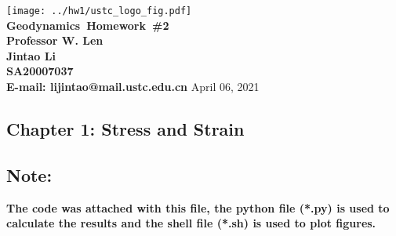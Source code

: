 \documentclass{article}
\makeatletter
\newcommand{\hmwkTitle}{Homework\ \#2}
\newcommand{\hmwkClass}{Geodynamics}
\newcommand{\hmwkClassInstructor}{Professor W. Len}
\newcommand{\hmwkAuthorName}{\textbf{Jintao Li}}
\newcommand{\hmwkAuthorID}{\textbf{SA20007037}}
\newcommand{\hmwkAuthoremail}{\textbf{E-mail: lijintao@mail.ustc.edu.cn}}
\makeatother
\begin{document}
\begin{titlepage}

\begin{center}

\textcolor{ustcblue}{\texttt{[image: ../hw1/ustc\_logo\_fig.pdf]} \\ [1cm]}
{ \Huge \bfseries \hmwkClass\ \hmwkTitle}\\[1cm]

\large \textbf{\hmwkClassInstructor} \\ [5cm]

\large \hmwkAuthorName \\ [0.25cm]
\large \hmwkAuthorID \\ [0.25cm]
\large \hmwkAuthoremail
\vfill
{\large April 06, 2021}

\end{center}

\end{titlepage}

\begin{center}
\section{Chapter 1: Stress and Strain}
\end{center}

\subsection{Note: }
\textbf{The code was attached with this file, the python file (*.py) is 
used to calculate the results and the shell file (*.sh) is used 
to plot figures.} \\
\end{document}
